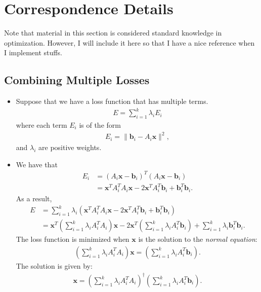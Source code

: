 \documentclass[10pt]{article}
\newcommand{\ve}[1]{\mathbf{#1}}
\begin{document}
\section{Correspondence Details}

Note that material in this section is considered standard knowledge in optimization. However, I will include it here so that I have a nice reference when I implement stuffs.

\subsection{Combining Multiple Losses}

\begin{itemize}
    \item Suppose that we have a loss function that has multiple terms.
    \begin{align*}
        E = \sum_{i=1}^k \lambda_i E_i
    \end{align*}
    where each term $E_i$ is of the form
    \begin{align*}
        E_i = \| \ve{b}_i - A_i \ve{x} \|^2,
    \end{align*}
    and $\lambda_i$ are positive weights.
    
    \item We have that
    \begin{align*}
        E_i 
        &= (A_i \ve{x} - \ve{b}_i)^T (A_i \ve{x} - \ve{b}_i) \\
        &= \ve{x}^T A_i^T A_i \ve{x} - 2 \ve{x}^T A_i^T \ve{b}_i + \ve{b}_i^T \ve{b}_i.
    \end{align*}
    As a result,
    \begin{align*}
        E 
        &= \sum_{i=1}^k \lambda_i (\ve{x}^T A_i^T A_i \ve{x} - 2 \ve{x}^T A_i^T \ve{b}_i + \ve{b}_i^T \ve{b}_i) \\ 
        &= \ve{x}^T \left( \sum_{i=1}^k \lambda_i A_i^T A_i \right) \ve{x} - 2 \ve{x}^T \left( \sum_{i=1}^k \lambda_i  A_i^T \ve{b}_i \right) + \sum_{i=1}^k \lambda_i \ve{b}_i^T \ve{b}_i.
    \end{align*}
    The loss function is minimized when $\ve{x}$ is the solution to the \emph{normal equation}:
    \begin{align*}
        \left( \sum_{i=1}^k \lambda_i A_i^T A_i \right) \ve{x} = \left( \sum_{i=1}^k \lambda_i A_i^T \ve{b}_i \right).
    \end{align*}
    The solution is given by:    
    \begin{align*}
        \ve{x} = \left( \sum_{i=1}^k \lambda_i A_i^T A_i \right)^{\dagger} \left( \sum_{i=1}^k \lambda_i A_i^T \ve{b}_i \right).
    \end{align*}    
\end{itemize}
\end{document}
